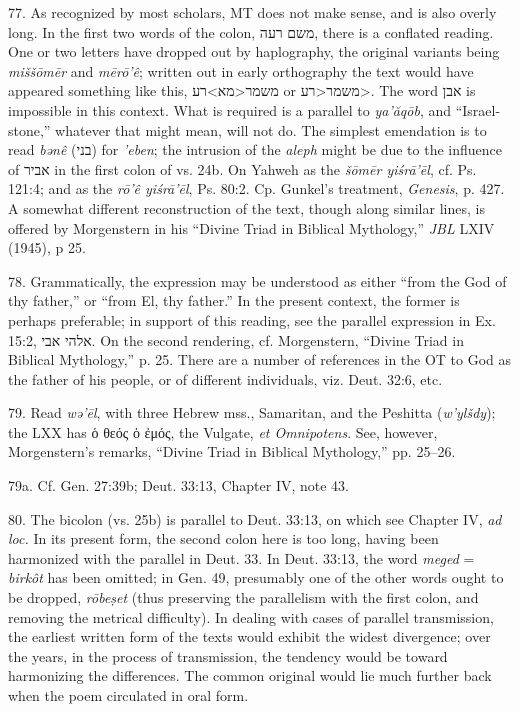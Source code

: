 \begin{enumerate}
77. As recognized by most scholars, MT does not make sense, and is also overly
long. In the first two words of the colon, משם רעה, there is a conflated
reading. One or two letters have dropped out by haplography, the original
variants being \emph{miššōmēr} and \emph{mērō'ê}; written out in early
orthography the text would have appeared something like this,
משמר<מא>רע or משמר<רע>. The word אבן is impossible in this context. What is
required is a parallel to \emph{ya'ăqōb}, and ``Israel-stone,'' whatever that
might mean, will not do. The simplest emendation is to read \emph{bənê} (בני)
for \emph{'eben}; the intrusion of the \emph{aleph} might be due to the
influence of אביר in the first colon of vs. 24b. On Yahweh as the
\emph{šōmēr yiśrā'ēl}, cf. Ps. 121:4; and as the \emph{rō'ê yiśrā'ēl},
Ps. 80:2. Cp. Gunkel's treatment, \emph{Genesis}, p. 427. A somewhat different
reconstruction of the text, though along similar lines, is offered by
Morgenstern in his ``Divine Triad in Biblical Mythology,'' \emph{JBL} LXIV
(1945), p 25.

78. Grammatically, the expression may be understood as either ``from the God of
thy father,'' or ``from El, thy father.'' In the present context, the former is
perhaps preferable; in support of this reading, see the parallel expression in
Ex. 15:2, אלהי אבי. On the second rendering, cf. Morgenstern, ``Divine Triad in
Biblical Mythology,'' p. 25. There are a number of references in the OT to God
as the father of his people, or of different individuals, viz. Deut. 32:6, etc.

79. Read \emph{wə'ēl}, with three Hebrew mss., Samaritan, and the Peshitta
(\emph{w'ylšdy}); the LXX has ὁ θεός ὁ ἐμός, the Vulgate, \emph{et Omnipotens}.
See, however, Morgenstern's remarks, ``Divine Triad in Biblical Mythology,''
pp. 25--26.

79a. Cf. Gen. 27:39b; Deut. 33:13, Chapter IV, note 43.

80. The bicolon (vs. 25b) is parallel to Deut. 33:13, on which see Chapter IV,
\emph{ad loc.} In its present form, the second colon here is too long, having
been harmonized with the parallel in Deut. 33. In Deut. 33:13, the word
\emph{meged} = \emph{birkôt} has been omitted; in Gen. 49, presumably one of
the other words ought to be dropped, \emph{rōbeṣet} (thus preserving the
parallelism with the first colon, and removing the metrical difficulty). In
dealing with cases of parallel transmission, the earliest written form of the
texts would exhibit the widest divergence; over the years, in the process of
transmission, the tendency would be toward harmonizing the differences. The
common original would lie much further back when the poem circulated in oral
form.


\end{enumerate}
